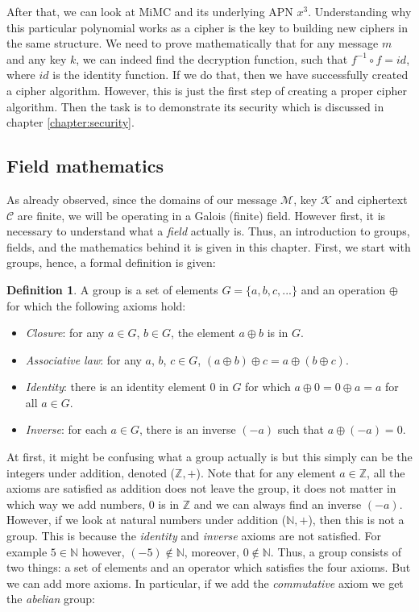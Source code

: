\documentclass{Resources/UoBLab1}
\theoremstyle{definition}
\newtheorem{definition}[theorem]{Definition}
\begin{document}
After that, we can look at MiMC and its underlying APN $x^3$. Understanding why this particular polynomial works as a cipher is the key to building new ciphers in the same structure. We need to prove mathematically that for any message $m$ and any key $k$, we can indeed find the decryption function, such that \(f^{-1} \circ f = id\), where $id$ is the identity function. If we do that, then we have successfully created a cipher algorithm. However, this is just the first step of creating a proper cipher algorithm. Then the task is to demonstrate its security which is discussed in chapter \ref{chapter:security}.

\subsection{Field mathematics}\label{sub:field-maths}
As already observed, since the domains of our message $\mathcal{M}$, key $\mathcal{K}$ and ciphertext $\mathcal{C}$ are finite, we will be operating in a Galois (finite) field. However first, it is necessary to understand what a \textit{field} actually is. Thus, an introduction to groups, fields, and the mathematics behind it is given in this chapter. First, we start with groups, hence, a formal definition is given:
\begin{definition}
    A group is a set of elements $G = \{a, b, c, ...\}$ and an operation $\oplus$ for which the following axioms hold:
    \begin{itemize}
        \item \textit{Closure}: for any $a \in G$, $b \in G$, the element $a \oplus b$ is in $G$.
        \item \textit{Associative law}: for any $a$, $b$, $c \in G$, $(a \oplus b) \oplus c = a \oplus (b \oplus c)$.
        \item \textit{Identity}: there is an identity element $0$ in $G$ for which $a \oplus 0 = 0 \oplus a = a$ for all $a \in G$.
        \item \textit{Inverse}: for each $a \in G$, there is an inverse $(-a)$ such that $a \oplus (-a) = 0$.
    \end{itemize}
\end{definition}
At first, it might be confusing what a group actually is but this simply can be the integers under addition, denoted ($\mathbb{Z}, +$). Note that for any element $a \in \mathbb{Z}$, all the axioms are satisfied as addition does not leave the group, it does not matter in which way we add numbers, $0$ is in $\mathbb{Z}$ and we can always find an inverse $(-a)$. However, if we look at natural numbers under addition ($\mathbb{N}, +$), then this is not a group. This is because the \textit{identity} and \textit{inverse} axioms are not satisfied. For example $5 \in \mathbb{N}$ however, $(-5) \notin \mathbb{N}$, moreover, $0 \notin \mathbb{N}$. Thus, a group consists of two things: a set of elements and an operator which satisfies the four axioms. But we can add more axioms. In particular, if we add the \textit{commutative} axiom we get the \textit{abelian} group:
\end{document}
